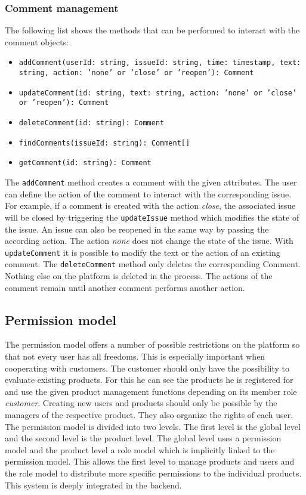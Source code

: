     \subsubsection*{Comment management}
    The following list shows the methods that can be performed to interact with the comment objects:
    \begin{itemize}
        \item \texttt{addComment(userId: string, issueId: string, time: timestamp, text: string, action: 'none' or 'close' or 'reopen'): Comment}
        \item \texttt{updateComment(id: string, text: string, action: 'none' or 'close' or 'reopen'): Comment}
        \item \texttt{deleteComment(id: string): Comment}
        \item \texttt{findComments(issueId: string): Comment[]}
        \item \texttt{getComment(id: string): Comment}
    \end{itemize}
    The \texttt{addComment} method creates a comment with the given attributes. The user can define the action of the comment to interact with the corresponding issue. For example, if a comment is created with the action \textit{close}, the associated issue will be closed by triggering the \texttt{updateIssue} method which modifies the state of the issue. An issue can also be reopened in the same way by passing the according action. The action \textit{none} does not change the state of the issue. 
    With \texttt{updateComment} it is possible to modify the text or the action of an existing comment.
    The \texttt{deleteComment} method only deletes the corresponding Comment. Nothing else on the platform is deleted in the process. The actions of the comment remain until another comment performs another action.

    \subsection*{Permission model}
    \label{subsec:permissionModel}
    The permission model offers a number of possible restrictions on the platform so that not every user has all freedoms. This is especially important when cooperating with customers. The customer should only have the possibility to evaluate existing products. For this he can see the products he is registered for and use the given product management functions depending on its member role \textit{customer}. Creating new users and products should only be possible by the managers of the respective product. They also organize the rights of each user. The permission model is divided into two levels. The first level is the global level and the second level is the product level. The global level uses a permission model and the product level a role model which is implicitly linked to the permission model. 
    This allows the first level to manage products and users and the role model to distribute more specific permissions to the individual products. This system is deeply integrated in the backend.

